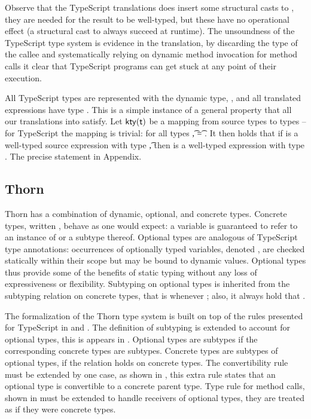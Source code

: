 \documentclass[acmlarge, anonymous, authordraft, review]{acmart} %
\begin{document}
\noindent
Observe that the TypeScript translations does insert some structural casts
to \any, they are needed for the result to be well-typed, but these have no
operational effect (a structural cast to \any always succeed at runtime).
The unsoundness of the TypeScript type system is evidence in the
translation, by discarding the type of the callee and systematically relying
on dynamic method invocation for method calls it clear that TypeScript
programs can get stuck at any point of their execution.


All TypeScript types are represented with the dynamic \kafka type, \any, and
all translated expressions have type \any.  This is a simple instance of a
general property that all our translations into \kafka satisfy.  Let
\(\kty\t\) be a mapping from source types to \kafka types -- for TypeScript
the mapping is trivial: for all types \t, \kty\t = \src{\any}.  It then
holds that if \e is a well-typed source expression with type \t, then
\TR{\e} is a well-typed \kafka expression with type \kty{\t}.  The precise
statement in Appendix.


\subsection{Thorn}

Thorn has a combination of dynamic, optional, and concrete types.  Concrete
types, written \C, behave as one would expect: a variable \HT\x\C is
guaranteed to refer to an instance of \C or a subtype thereof.  Optional
types are analogous of TypeScript type annotations: occurrences of
optionally typed variables, denoted \HT\x{\dt\C}, are checked statically
within their scope but may be bound to dynamic values.  Optional types thus
provide some of the benefits of static typing without any loss of
expressiveness or flexibility.  Subtyping on optional types is inherited
from the subtyping relation on concrete types, that is {\dt\C} \Sub {\dt\D}
whenever \C \Sub \D; also, it always hold that \C \Sub \dt\C.

The formalization of the Thorn type system is built on top of the rules
presented for TypeScript in  and . The
definition of subtyping is extended to account for optional types, this is
appears in . Optional types are subtypes if the corresponding
concrete types are subtypes. Concrete types are subtypes of optional types,
if the relation holds on concrete types. The convertibility rule must be
extended by one case, as shown in , this extra rule states
that an optional type is convertible to a concrete parent type. Type rule
for method calls, shown in  must be extended to handle
receivers of optional types, they are treated as if they were concrete
types.
\end{document}
